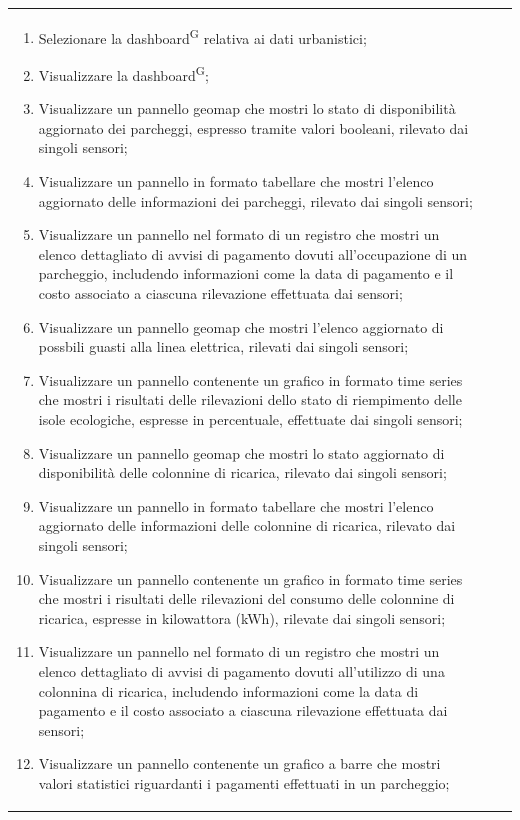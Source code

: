 \documentclass[8pt]{article}
\newcommand{\glossterm}[1]{#1\textsuperscript{G}} %
\begin{document}
\begin{longtable}{|>{\centering}p{2cm}|>{\RaggedRight}m{12cm}|>{\centering\arraybackslash}p{2cm}|}
\begin{enumerate}
        \item Selezionare la \glossterm{dashboard} relativa ai dati urbanistici;
        \item Visualizzare la \glossterm{dashboard};
        \item Visualizzare un pannello geomap che mostri lo stato di disponibilità aggiornato dei
            parcheggi, espresso tramite valori booleani, rilevato dai singoli sensori;
        \item Visualizzare un pannello in formato tabellare che mostri l'elenco aggiornato delle informazioni dei
            parcheggi, rilevato dai singoli sensori;
        \item Visualizzare un pannello nel formato di un registro che mostri un elenco dettagliato di
            avvisi di pagamento dovuti all'occupazione di un parcheggio, includendo informazioni come la data di pagamento e il costo
            associato a ciascuna rilevazione effettuata dai sensori;
        \item Visualizzare un pannello geomap che mostri l'elenco aggiornato di possbili guasti alla linea elettrica, rilevati dai singoli sensori;
        \item Visualizzare un pannello contenente un grafico in formato time series che mostri i
            risultati delle rilevazioni dello stato di riempimento delle isole ecologiche, espresse in percentuale, effettuate dai singoli sensori;
        \item Visualizzare un pannello geomap che mostri lo stato aggiornato di disponibilità delle colonnine di ricarica,
            rilevato dai singoli sensori;
        \item Visualizzare un pannello in formato tabellare che mostri l'elenco aggiornato delle informazioni delle colonnine di ricarica,
            rilevato dai singoli sensori;
        \item Visualizzare un pannello contenente un grafico in formato time series che mostri i
            risultati delle rilevazioni del consumo delle colonnine di ricarica, espresse in kilowattora (kWh), rilevate dai singoli sensori;
        \item Visualizzare un pannello nel formato di un registro che mostri un elenco dettagliato di
            avvisi di pagamento dovuti all'utilizzo di una colonnina di ricarica, includendo informazioni come la data di pagamento e il costo associato a ciascuna rilevazione effettuata dai sensori;
        \item Visualizzare un pannello contenente un grafico a barre che mostri valori statistici riguardanti i pagamenti effettuati in un parcheggio;

\end{enumerate}
\end{longtable}
\end{document}
